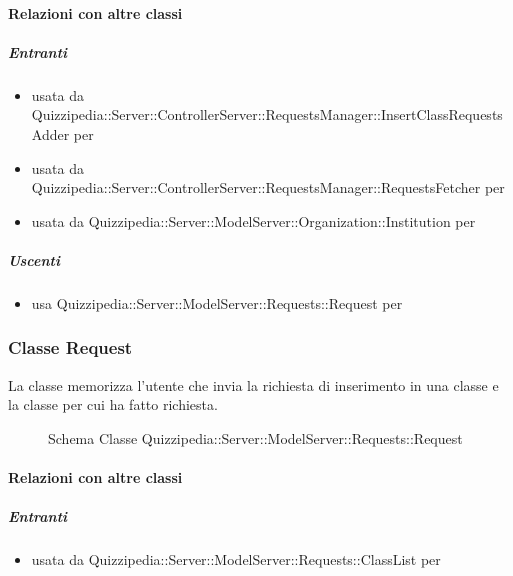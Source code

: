 \paragraph{Relazioni con altre classi}
\subparagraph{Entranti}
\begin{itemize}
\item usata da Quizzipedia::Server::ControllerServer::RequestsManager::InsertClassRequestsAdder per 
\item usata da Quizzipedia::Server::ControllerServer::RequestsManager::RequestsFetcher per 
\item usata da Quizzipedia::Server::ModelServer::Organization::Institution per 
\end{itemize}
\subparagraph{Uscenti}
\begin{itemize}
\item usa Quizzipedia::Server::ModelServer::Requests::Request per 
\end{itemize}
\subsubsection{Classe Request}
La classe memorizza l'utente che invia la richiesta di inserimento in una classe e la classe per cui ha fatto richiesta.
\begin{figure}[H]
\centering
\noindent{}
\caption[Schema Classe Request]{Schema Classe Quizzipedia::Server::ModelServer::Requests::Request}
\end{figure}
\paragraph{Relazioni con altre classi}
\subparagraph{Entranti}
\begin{itemize}
\item usata da Quizzipedia::Server::ModelServer::Requests::ClassList per 
\end{itemize}
